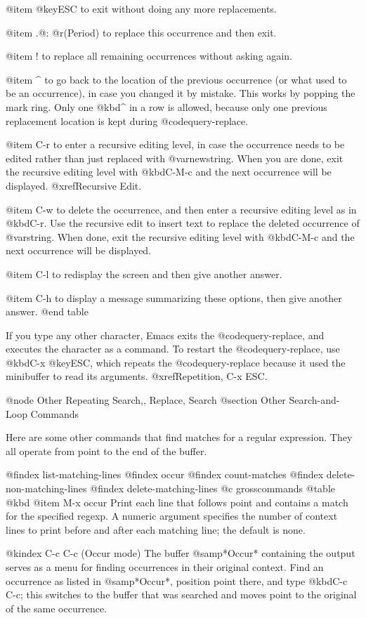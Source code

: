 {{{{{{{{{{{{{{{{@item @key{ESC}
to exit without doing any more replacements.

@item .@: @r{(Period)}
to replace this occurrence and then exit.

@item !
to replace all remaining occurrences without asking again.

@item ^
to go back to the location of the previous occurrence (or what used to
be an occurrence), in case you changed it by mistake.  This works by
popping the mark ring.  Only one @kbd{^} in a row is allowed, because
only one previous replacement location is kept during @code{query-replace}.

@item C-r
to enter a recursive editing level, in case the occurrence needs to be
edited rather than just replaced with @var{newstring}.  When you are
done, exit the recursive editing level with @kbd{C-M-c} and the next
occurrence will be displayed.  @xref{Recursive Edit}.

@item C-w
to delete the occurrence, and then enter a recursive editing level as
in @kbd{C-r}.  Use the recursive edit to insert text to replace the
deleted occurrence of @var{string}.  When done, exit the recursive
editing level with @kbd{C-M-c} and the next occurrence will be
displayed.

@item C-l
to redisplay the screen and then give another answer.

@item C-h
to display a message summarizing these options, then give another
answer.
@end table

  If you type any other character, Emacs exits the @code{query-replace}, and
executes the character as a command.  To restart the @code{query-replace},
use @kbd{C-x @key{ESC}}, which repeats the @code{query-replace} because it
used the minibuffer to read its arguments.  @xref{Repetition, C-x ESC}.

@node Other Repeating Search,, Replace, Search
@section Other Search-and-Loop Commands

  Here are some other commands that find matches for a regular expression.
They all operate from point to the end of the buffer.

@findex list-matching-lines
@findex occur
@findex count-matches
@findex delete-non-matching-lines
@findex delete-matching-lines
@c grosscommands
@table @kbd
@item M-x occur
Print each line that follows point and contains a match for the
specified regexp.  A numeric argument specifies the number of context
lines to print before and after each matching line; the default is
none.

@kindex C-c C-c (Occur mode)
The buffer @samp{*Occur*} containing the output serves as a menu for
finding occurrences in their original context.  Find an occurrence
as listed in @samp{*Occur*}, position point there, and type @kbd{C-c
C-c}; this switches to the buffer that was searched and moves point to
the original of the same occurrence.

}}}}}}}}}}}}}}}}
